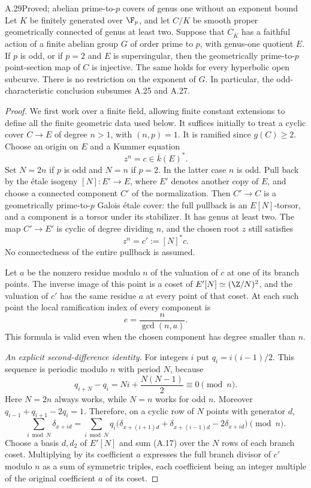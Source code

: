 \begin{claim}{A.29}{Proved; abelian prime-to-$p$ covers of genus one without an exponent bound}
Let $K$ be finitely generated over $\F_p$, and let $C/K$ be
smooth proper geometrically connected of genus at least two.
Suppose that $C_{\overline K}$ has a faithful action of a finite
abelian group $G$ of order prime to $p$, with genus-one quotient
$E$. If $p$ is odd, or if $p=2$ and $E$ is supersingular, then
the geometrically prime-to-$p$ point-section map of $C$ is
injective. The same holds for every hyperbolic open subcurve.
There is no restriction on the exponent of $G$. In particular,
the odd-characteristic conclusion subsumes A.25 and A.27.
\end{claim}
\begin{proof}
We first work over a finite field, allowing finite constant
extensions to define all the finite geometric data used below.
It suffices initially to treat a cyclic cover $C\to E$ of degree
$n>1$, with $(n,p)=1$. It is ramified since $g(C)\ge2$.
Choose an origin on $E$ and a Kummer equation
\[
 z^n=c\in\overline k(E)^*.
\]
Set $N=2n$ if $p$ is odd and $N=n$ if $p=2$. In the latter
case $n$ is odd. Pull back by the \'etale isogeny
$[N]:E'\to E$, where $E'$ denotes another copy of $E$, and
choose a connected component $C'$ of the normalization. Then
$C'\to C$ is a geometrically prime-to-$p$ Galois \'etale cover:
the full pullback is an $E[N]$-torsor, and a component is a
torsor under its stabilizer. It has genus at least two.
The map $C'\to E'$ is cyclic of degree dividing $n$, and the
chosen root $z$ still satisfies
\[
 z^n=c':=[N]^*c.
\]
No connectedness of the entire pullback is assumed.

Let $a$ be the nonzero residue modulo $n$ of the valuation of
$c$ at one of its branch points. The inverse image of this
point is a coset of $E'[N]\simeq(\Z/N)^2$, and the valuation
of $c'$ has the same residue $a$ at every point of that coset.
At each such point the local ramification index of every
component is
\[
 e=\frac n{\gcd(n,a)}.                                      \tag{A.16}
\]
This formula is valid even when the chosen component has
degree smaller than $n$.

\emph{An explicit second-difference identity.}
For integers $i$ put $q_i=i(i-1)/2$. This sequence is periodic
modulo $n$ with period $N$, because
\[
 q_{i+N}-q_i=Ni+\frac{N(N-1)}2\equiv0\pmod n.
\]
Here $N=2n$ always works, while $N=n$ works for odd $n$.
Moreover $q_{i-1}+q_{i+1}-2q_i=1$. Therefore, on a cyclic
row of $N$ points with generator $d$,
\[
 \sum_{i\bmod N}\delta_{x+id}
 =\sum_{i\bmod N}q_i
  \bigl(\delta_{x+(i+1)d}+\delta_{x+(i-1)d}
                  -2\delta_{x+id}\bigr)\pmod n.             \tag{A.17}
\]
Choose a basis $d,d_2$ of $E'[N]$ and sum (A.17) over the
$N$ rows of each branch coset. Multiplying by its coefficient
$a$ expresses the full branch divisor of $c'$ modulo $n$ as
a sum of symmetric triples, each coefficient being an integer
multiple of the original coefficient $a$ of its coset.


\end{proof}
